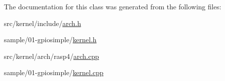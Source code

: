 The documentation for this class was generated from the following files\+:\begin{DoxyCompactItemize}
\item 
src/kernel/include/\hyperlink{arch_8h}{arch.\+h}\item 
sample/01-\/gpiosimple/\hyperlink{kernel_8h}{kernel.\+h}\item 
src/kernel/arch/rasp4/\hyperlink{arch_8cpp}{arch.\+cpp}\item 
sample/01-\/gpiosimple/\hyperlink{kernel_8cpp}{kernel.\+cpp}\end{DoxyCompactItemize}
